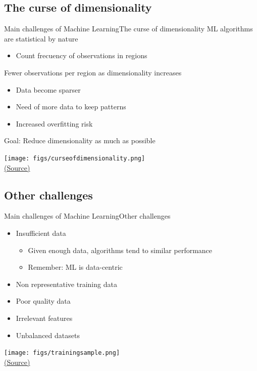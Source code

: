 \documentclass[10pt,compress]{beamer} %
\begin{document}
\subsection{The curse of dimensionality}
\begin{frame}{Main challenges of Machine Learning}{The curse of dimensionality}
	ML algorithms are statistical by nature
	\begin{itemize}
		\item Count frecuency of observations in regions
	\end{itemize}

	Fewer observations per region as dimensionality increases
	\begin{itemize}
		\item Data become sparser
		\item Need of more data to keep patterns
		\item Increased overfitting risk
	\end{itemize}
	Goal: Reduce dimensionality as much as possible 

	\begin{center}
	\texttt{[image: figs/curseofdimensionality.png]}\\
	\tiny{\href{http://www.visiondummy.com/2014/04/curse-dimensionality-affect-classification/}{(Source)}}
   	\end{center} 
\end{frame}

\subsection{Other challenges}
\begin{frame}{Main challenges of Machine Learning}{Other challenges}
	\begin{itemize}
    	\item Insufficient data
			\begin{itemize}
				\item Given enough data, algorithms tend to similar performance
				\item Remember: ML is data-centric
			\end{itemize}
		\item Non representative training data
		\item Poor quality data
		\item Irrelevant features
        \item Unbalanced datasets
    \end{itemize}
	
	\bigskip
	\begin{center}
	\texttt{[image: figs/trainingsample.png]}\\
    \tiny{\href{https://github.com/ageron/handson-ml/blob/master/01_the_machine_learning_landscape.ipynb}{(Source)}}
	\end{center}
\end{frame}
\end{document}
